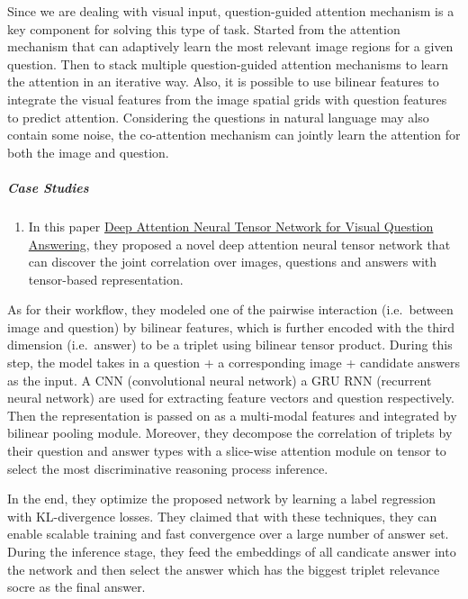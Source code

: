 \documentclass[]{book}
\providecommand{\tightlist}{%
  \setlength{\itemsep}{0pt}\setlength{\parskip}{0pt}}
\let\oldsubparagraph\subparagraph
\renewcommand{\subparagraph}[1]{\oldsubparagraph{#1}\mbox{}}
\theoremstyle{definition}
\theoremstyle{definition}
\theoremstyle{definition}
\theoremstyle{remark}
\begin{document}
Since we are dealing with visual input, question-guided attention
mechanism is a key component for solving this type of task. Started from
the attention mechanism that can adaptively learn the most relevant
image regions for a given question. Then to stack multiple
question-guided attention mechanisms to learn the attention in an
iterative way. Also, it is possible to use bilinear features to
integrate the visual features from the image spatial grids with question
features to predict attention. Considering the questions in natural
language may also contain some noise, the co-attention mechanism can
jointly learn the attention for both the image and question.

\subparagraph{Case Studies}\label{case-studies-1}

\begin{enumerate}
\def\labelenumi{\arabic{enumi}.}
\tightlist
\item
  In this paper
  \href{http://openaccess.thecvf.com/content_ECCV_2018/papers/Yalong_Bai_Deep_Attention_Neural_ECCV_2018_paper.pdf}{Deep
  Attention Neural Tensor Network for Visual Question Answering}, they
  proposed a novel deep attention neural tensor network that can
  discover the joint correlation over images, questions and answers with
  tensor-based representation.
\end{enumerate}

As for their workflow, they modeled one of the pairwise interaction
(i.e.~between image and question) by bilinear features, which is further
encoded with the third dimension (i.e.~answer) to be a triplet using
bilinear tensor product. During this step, the model takes in a question
+ a corresponding image + candidate answers as the input. A CNN
(convolutional neural network) a GRU RNN (recurrent neural network) are
used for extracting feature vectors and question respectively. Then the
representation is passed on as a multi-modal features and integrated by
bilinear pooling module. Moreover, they decompose the correlation of
triplets by their question and answer types with a slice-wise attention
module on tensor to select the most discriminative reasoning process
inference.

In the end, they optimize the proposed network by learning a label
regression with KL-divergence losses. They claimed that with these
techniques, they can enable scalable training and fast convergence over
a large number of answer set. During the inference stage, they feed the
embeddings of all candicate answer into the network and then select the
answer which has the biggest triplet relevance socre as the final
answer.
\end{document}
